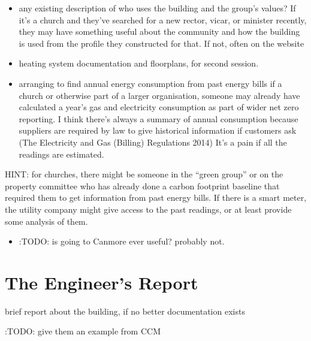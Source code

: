 \documentclass[letterpaper,10pt,english]{jupyterBook}
\begin{document}
\begin{itemize}
\item {} 
\sphinxAtStartPar
any existing description of who uses the building and the group’s values? If it’s a church and they’ve searched for a new rector, vicar, or minister recently, they may have something useful about the community and how the building is used from the profile they constructed for that.  If not, often on the website

\item {} 
\sphinxAtStartPar
heating system documentation and floorplans, for second session.

\item {} 
\sphinxAtStartPar
arranging to find annual energy consumption from past energy bills \sphinxhyphen{} if a church or otherwise part of a larger organisation, someone may already have calculated a year’s gas and electricity consumption as part of wider net zero reporting.  I think there’s always a summary of annual consumption because suppliers are required by law to give historical information if customers ask (The Electricity and Gas (Billing) Regulations 2014)  It’s a pain if all the readings are estimated.

\end{itemize}

\sphinxAtStartPar
HINT:  for churches, there might be someone in the “green group” or on the property committee who has already done a carbon footprint baseline that required them to get information from past energy bills.
If there is a smart meter, the utility company might give access to the past readings, or at least provide some analysis of them.
\begin{itemize}
\item {} 
\sphinxAtStartPar
:TODO: is going to Canmore ever useful? probably not.

\end{itemize}

\sphinxstepscope


\section{The Engineer’s Report}
\label{\detokenize{session1/details/engineers-report:the-engineer-s-report}}\label{\detokenize{session1/details/engineers-report::doc}}
\sphinxAtStartPar
brief report about the building, if no better documentation exists

\sphinxAtStartPar
:TODO: give them an example from CCM
\end{document}
